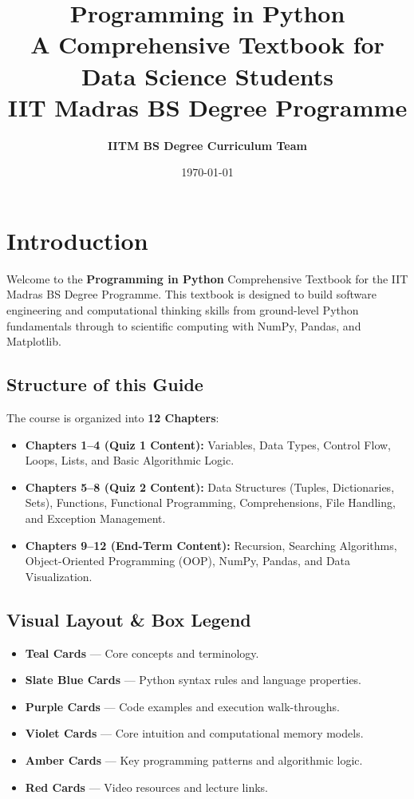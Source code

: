 \documentclass[11pt,a4paper,oneside]{book}
\title{
    \vspace{-2cm}
    \Huge\bfseries\sffamily Programming in Python \\[0.5em]
    \Large\sffamily A Comprehensive Textbook for Data Science Students \\[0.3em]
    \large\sffamily IIT Madras BS Degree Programme
}
\author{\textbf{IITM BS Degree Curriculum Team}}
\date{\today}
\begin{document}
\maketitle

\frontmatter
\tableofcontents
\newpage

\chapter*{Introduction}

Welcome to the \textbf{Programming in Python} Comprehensive Textbook for the IIT Madras BS Degree Programme. This textbook is designed to build software engineering and computational thinking skills from ground-level Python fundamentals through to scientific computing with NumPy, Pandas, and Matplotlib.

\section*{Structure of this Guide}
The course is organized into \textbf{12 Chapters}:
\begin{itemize}
    \item \textbf{Chapters 1--4 (Quiz 1 Content):} Variables, Data Types, Control Flow, Loops, Lists, and Basic Algorithmic Logic.
    \item \textbf{Chapters 5--8 (Quiz 2 Content):} Data Structures (Tuples, Dictionaries, Sets), Functions, Functional Programming, Comprehensions, File Handling, and Exception Management.
    \item \textbf{Chapters 9--12 (End-Term Content):} Recursion, Searching Algorithms, Object-Oriented Programming (OOP), NumPy, Pandas, and Data Visualization.
\end{itemize}

\section*{Visual Layout \& Box Legend}
\begin{itemize}
    \item \textcolor{tealdef}{\textbf{Teal Cards}} --- Core concepts and terminology.
    \item \textcolor{primaryborder}{\textbf{Slate Blue Cards}} --- Python syntax rules and language properties.
    \item \textcolor{purpleex}{\textbf{Purple Cards}} --- Code examples and execution walk-throughs.
    \item \textcolor{purpleex}{\textbf{Violet Cards}} --- Core intuition and computational memory models.
    \item \textcolor{coralformula}{\textbf{Amber Cards}} --- Key programming patterns and algorithmic logic.
    \item \textcolor{yttext}{\textbf{Red Cards}} --- Video resources and lecture links.
\end{itemize}
\end{document}
